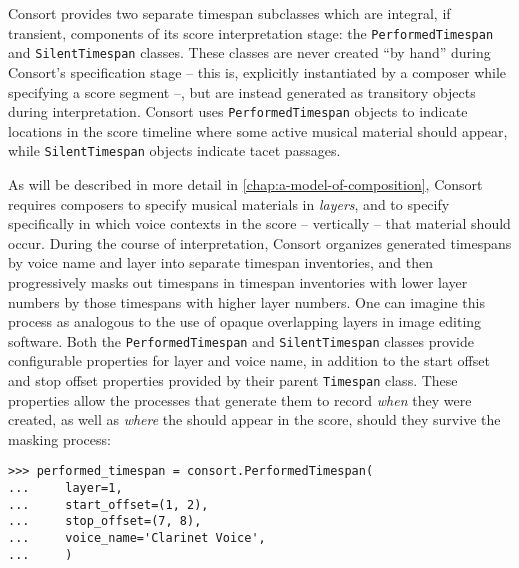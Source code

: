 Consort provides two separate timespan subclasses which are integral, if
transient, components of its score interpretation stage: the
\texttt{PerformedTimespan} and \texttt{SilentTimespan} classes. These classes
are never created \enquote{by hand} during Consort's specification stage --
this is, explicitly instantiated by a composer while specifying a score segment
--, but are instead generated as transitory objects during interpretation.
Consort uses \texttt{PerformedTimespan} objects to indicate locations in the
score timeline where some active musical material should appear, while
\texttt{SilentTimespan} objects indicate tacet passages.

As will be described in more detail in \autoref{chap:a-model-of-composition},
Consort requires composers to specify musical materials in \emph{layers}, and
to specify specifically in which voice contexts in the score -- vertically --
that material should occur. During the course of interpretation, Consort
organizes generated timespans by voice name and layer into separate timespan
inventories, and then progressively masks out timespans in timespan inventories
with lower layer numbers by those timespans with higher layer numbers. One can
imagine this process as analogous to the use of opaque overlapping layers in
image editing software. Both the \texttt{PerformedTimespan} and
\texttt{SilentTimespan} classes provide configurable properties for layer and
voice name, in addition to the start offset and stop offset properties provided
by their parent \texttt{Timespan} class. These properties allow the processes
that generate them to record \emph{when} they were created, as well as
\emph{where} the should appear in the score, should they survive the masking
process:

\begin{comment}
<abjad>
performed_timespan = consort.PerformedTimespan(
    layer=1,
    start_offset=(1, 2),
    stop_offset=(7, 8),
    voice_name='Clarinet Voice',
    )
</abjad>
\end{comment}

\begin{abjadbookoutput}
\begin{singlespacing}
\vspace{-0.5\baselineskip}
\begin{verbatim}
>>> performed_timespan = consort.PerformedTimespan(
...     layer=1,
...     start_offset=(1, 2),
...     stop_offset=(7, 8),
...     voice_name='Clarinet Voice',
...     )
\end{verbatim}
\end{singlespacing}
\end{abjadbookoutput}

